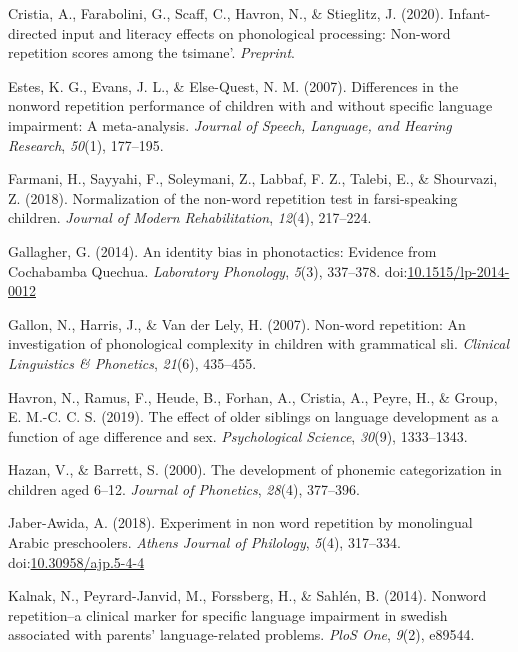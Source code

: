 \documentclass[english,,man,floatsintext]{apa6}
\begin{document}
\hypertarget{ref-cristia2020infant}{}
Cristia, A., Farabolini, G., Scaff, C., Havron, N., \& Stieglitz, J.
(2020). Infant-directed input and literacy effects on phonological
processing: Non-word repetition scores among the tsimane'.
\emph{Preprint}.

\hypertarget{ref-estes2007differences}{}
Estes, K. G., Evans, J. L., \& Else-Quest, N. M. (2007). Differences in
the nonword repetition performance of children with and without specific
language impairment: A meta-analysis. \emph{Journal of Speech, Language,
and Hearing Research}, \emph{50}(1), 177--195.

\hypertarget{ref-farmani2018normalization}{}
Farmani, H., Sayyahi, F., Soleymani, Z., Labbaf, F. Z., Talebi, E., \&
Shourvazi, Z. (2018). Normalization of the non-word repetition test in
farsi-speaking children. \emph{Journal of Modern Rehabilitation},
\emph{12}(4), 217--224.

\hypertarget{ref-gallagher2014identity}{}
Gallagher, G. (2014). An identity bias in phonotactics: Evidence from
Cochabamba Quechua. \emph{Laboratory Phonology}, \emph{5}(3), 337--378.
doi:\href{https://doi.org/10.1515/lp-2014-0012}{10.1515/lp-2014-0012}

\hypertarget{ref-gallon2007non}{}
Gallon, N., Harris, J., \& Van der Lely, H. (2007). Non-word repetition:
An investigation of phonological complexity in children with grammatical
sli. \emph{Clinical Linguistics \& Phonetics}, \emph{21}(6), 435--455.

\hypertarget{ref-havron2019effect}{}
Havron, N., Ramus, F., Heude, B., Forhan, A., Cristia, A., Peyre, H., \&
Group, E. M.-C. C. S. (2019). The effect of older siblings on language
development as a function of age difference and sex. \emph{Psychological
Science}, \emph{30}(9), 1333--1343.

\hypertarget{ref-hazan2000development}{}
Hazan, V., \& Barrett, S. (2000). The development of phonemic
categorization in children aged 6--12. \emph{Journal of Phonetics},
\emph{28}(4), 377--396.

\hypertarget{ref-jabere2018xperiment}{}
Jaber-Awida, A. (2018). Experiment in non word repetition by monolingual
Arabic preschoolers. \emph{Athens Journal of Philology}, \emph{5}(4),
317--334.
doi:\href{https://doi.org/10.30958/ajp.5-4-4}{10.30958/ajp.5-4-4}

\hypertarget{ref-kalnak2014nonword}{}
Kalnak, N., Peyrard-Janvid, M., Forssberg, H., \& Sahlén, B. (2014).
Nonword repetition--a clinical marker for specific language impairment
in swedish associated with parents' language-related problems.
\emph{PloS One}, \emph{9}(2), e89544.
\end{document}
